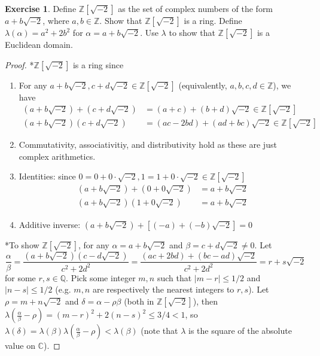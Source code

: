 \documentclass{article}
\theoremstyle{definition}
\newtheorem{exercise}{Exercise}
\begin{document}
\begin{exercise}
Define $\mathbb{Z}[\sqrt{-2}]$ as the set of complex numbers of the form $a + b \sqrt{-2}$, where $a, b \in \mathbb{Z}$. Show that $\mathbb{Z}[\sqrt{-2}]$ is a ring. Define $\lambda(\alpha) = a^2 + 2b^2$ for $\alpha = a + b \sqrt{-2}$. Use $\lambda$ to show that $\mathbb{Z}[\sqrt{-2}]$ is a Euclidean domain.
\end{exercise}
\begin{proof}
*$\mathbb{Z}[\sqrt{-2}]$ is a ring since
\begin{enumerate}
	\item For any $a + b \sqrt{-2}, c + d \sqrt{-2} \in \mathbb{Z}[\sqrt{-2}]$ (equivalently, $a, b, c, d \in \mathbb{Z}$), we have
	\begin{align*}
	(a + b \sqrt{-2}) + (c + d \sqrt{-2}) & = (a + c) + (b + d) \sqrt{-2} \in \mathbb{Z}[\sqrt{-2}] \\
	(a + b \sqrt{-2}) (c + d \sqrt{-2}) & = (ac - 2bd) + (ad + bc) \sqrt{-2} \in \mathbb{Z}[\sqrt{-2}]
	\end{align*}
	\item Commutativity, associativitiy, and distributivity hold as these are just complex arithmetics.
	\item Identities: since $0 = 0 + 0 \cdot \sqrt{-2}, 1 = 1 + 0 \cdot \sqrt{-2} \in \mathbb{Z}[\sqrt{-2}]$
	\begin{align*}
	(a + b \sqrt{-2}) + (0 + 0 \sqrt{-2}) & = a + b \sqrt{-2} \\
	(a + b \sqrt{-2}) (1 + 0 \sqrt{-2}) & = a + b \sqrt{-2}
	\end{align*}
	\item Additive inverse: $(a + b \sqrt{-2}) + [(-a) + (-b) \sqrt{-2}] = 0$
\end{enumerate}
*To show $\mathbb{Z}[\sqrt{-2}]$, for any $\alpha = a + b \sqrt{-2}$ and $\beta = c + d \sqrt{-2} \neq 0$. Let
$$\frac{\alpha}{\beta} = \frac{(a + b \sqrt{-2})(c - d \sqrt{-2})}{c^2 + 2d^2} = \frac{(ac + 2bd) + (bc - ad) \sqrt{-2}}{c^2 + 2d^2} = r + s \sqrt{-2}$$
for some $r, s \in \mathbb{Q}$. Pick some integer $m, n$ such that $|m - r| \leq 1/2$ and $|n - s| \leq 1/2$ (e.g. $m, n$ are respectively the nearest integers to $r, s$). Let $\rho = m + n \sqrt{-2}$ and $\delta = \alpha - \rho \beta$ (both in $\mathbb{Z}[\sqrt{-2}]$), then $\lambda \left( \frac{\alpha}{\beta} - \rho \right) = (m - r)^2 + 2(n - s)^2 \leq 3/4 < 1$, so $\lambda(\delta) = \lambda(\beta) \lambda \left( \frac{\alpha}{\beta} - \rho \right) < \lambda(\beta)$ (note that $\lambda$ is the square of the absolute value on $\mathbb{C}$). 
\end{proof}
\end{document}
